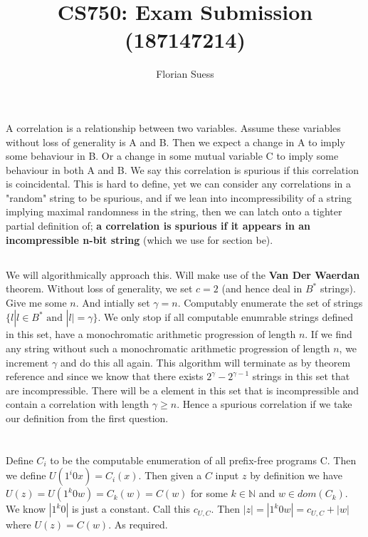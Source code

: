 \documentclass{article}
\title {CS750: Exam Submission (187147214)}
\author {Florian Suess}
\begin{document}
\maketitle

\section{}
\subsection{}
A correlation is a relationship between two variables. Assume these variables without loss of generality is A and B. Then we expect a change in A to imply some behaviour in B. Or a change in some mutual variable C to imply some behaviour in both A and B. We say this correlation is spurious if this correlation is coincidental. This is hard to define, yet we can consider any correlations in a "random" string to be spurious, and if we lean into incompressibility of a string implying maximal randomness in the string, then we can latch onto a tighter partial definition of; \textbf{a correlation is spurious if it appears in an incompressible n-bit string} (which we use for section be).

\subsection{}
We will algorithmically approach this. Will make use of the \textbf{Van Der Waerdan} theorem. Without loss of generality, we set $c=2$ (and hence deal in $B^*$ strings). Give me some $n$. And intially set $\gamma = n$. Computably enumerate the set of strings $\{l | l \in B^* \text{ and } |l| = \gamma\}$. We only stop if all computable enumrable strings defined in this set, have a monochromatic arithmetic progression of length $n$. If we find any string without such a monochromatic arithmetic progression of length $n$, we increment $\gamma$ and do this all again. This algorithm will terminate as by theorem reference and since we know that there exists $2^\gamma - 2^{\gamma-1}$ strings in this set that are incompressible. There will be a element in this set that is incompressible and contain a correlation with length $\gamma \geq n$. Hence a spurious correlation if we take our definition from the first question.

\section{}
Define $C_i$ to be the computable enumeration of all prefix-free programs C. Then we define $U(1^i0x) = C_i(x)$. Then given a $C$ input $z$ by definition we have $U(z) = U(1^k0w) = C_k(w) = C(w)$ for some $k \in \mathbb{N}$ and $w \in dom(C_k)$. We know $|1^k0|$ is just a constant. Call this $c_{U,C}$. Then $|z| = |1^k0w| = c_{U,C} + |w|$ where $U(z) = C(w)$. As required.
\end{document}
